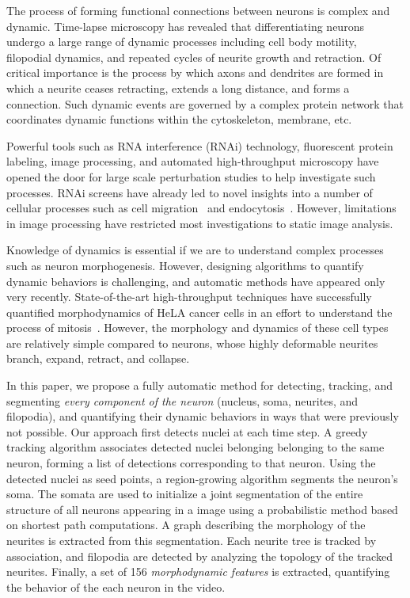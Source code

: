 

The  process  of forming  functional  connections  between neurons  is
complex  and   dynamic.   Time-lapse  microscopy   has  revealed  that
differentiating  neurons undergo  a large  range of  dynamic processes
including cell body motility, filopodial dynamics, and repeated cycles
of  neurite growth  and  retraction.  Of  critical  importance is  the
process  by which  axons and  dendrites are  formed in  which a neurite
ceases retracting, extends a   long  distance, and  forms
a connection. Such  dynamic events are  governed by a  complex protein
network that  coordinates   dynamic functions 
within the cytoskeleton, membrane, etc.

Powerful tools such as 
RNA interference  (RNAi)
technology,  fluorescent  protein   labeling,  image  processing,  and
automated high-throughput  microscopy have  opened the door  for large
scale  perturbation studies to help investigate such processes. RNAi  screens have  already led  to novel
insights   into  a  number   of  cellular   processes  such   as  cell
migration~\cite{Bakal07}  and endocytosis~\cite{Collinet10}.  However,
limitations  in  image  processing  have  restricted  most
investigations to static image analysis.

Knowledge  of dynamics is  essential if we are  to understand
complex  processes such  as neuron  morphogenesis.  However, designing
algorithms to quantify dynamic  behaviors is challenging, and
automatic methods  have appeared only  very recently. State-of-the-art
high-throughput techniques have successfully quantified morphodynamics
of  HeLA cancer  cells  in an  effort  to understand  the process  of
mitosis~\cite{Held10,Neumann10,Zhu05}.   However,  the morphology  and
dynamics of  these cell types  are relatively simple compared to neurons,
whose highly deformable  neurites  branch, expand,
retract, and collapse. 


In this paper, we  propose a  fully  automatic method  for  detecting, tracking,  and
segmenting {\em every component of the neuron} (nucleus,  soma, neurites, and filopodia), and quantifying  their dynamic behaviors in ways that were previously not possible. Our approach first  detects nuclei at each time step.  A greedy  tracking algorithm  associates detected nuclei belonging
belonging to the same neuron,  forming a list of detections corresponding  
to that neuron.  Using  the detected nuclei as seed  points, a region-growing
algorithm segments the neuron's soma.  The somata are used to
initialize a joint segmentation of the entire structure of all neurons
appearing in  a image using  a probabilistic method based  on shortest
path computations.   A  graph describing the  morphology of
the  neurites is extracted from  this segmentation.  Each neurite 
tree is tracked by association, and filopodia are detected
by analyzing the topology of the tracked neurites. Finally, 
a set of 156 {\em morphodynamic features} is extracted, quantifying
the behavior of the each neuron in the video.


